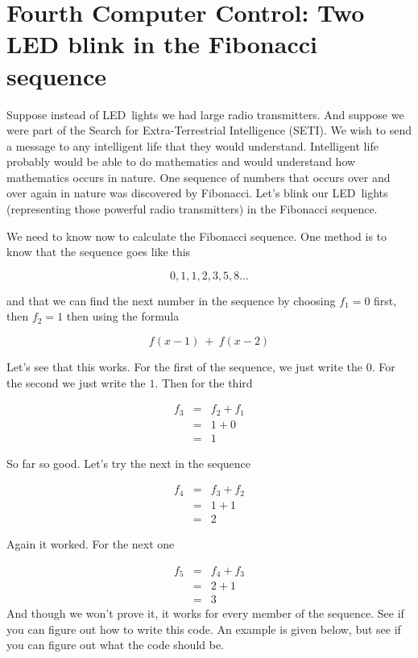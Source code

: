 \section{Fourth Computer Control: Two LED blink in the Fibonacci sequence}

Suppose instead of LED\ lights we had large radio transmitters. And suppose
we were part of the Search for Extra-Terrestrial Intelligence (SETI). We
wish to send a message to any intelligent life that they would understand.
Intelligent life probably would be able to do mathematics and would
understand how mathematics occurs in nature. One sequence of numbers that
occurs over and over again in nature was discovered by Fibonacci. Let's
blink our LED\ lights (representing those powerful radio transmitters) in
the Fibonacci sequence.

We need to know now to calculate the Fibonacci sequence. One method is to
know that the sequence goes like this

\begin{equation*}
	0,1,1,2,3,5,8\ldots
\end{equation*}

and that we can find the next number in the sequence by choosing $f_{1}=0$
first, then $f_{2}=1$ then using the formula 

\begin{equation*}
	f(x-1)\ +\ f(x-2)
\end{equation*}

Let's see that this works. For the first of the sequence, we just write the $
0.$ For the second we just write the $1.$ Then for the third 

\begin{eqnarray*}
	f_{3} &=&f_{2}+f_{1} \\
	&=&1+0 \\
	&=&1
\end{eqnarray*}

So far so good. Let's try the next in the sequence

\begin{eqnarray*}
	f_{4} &=&f_{3}+f_{2} \\
	&=&1+1 \\
	&=&2
\end{eqnarray*}

Again it worked. For the next one

\begin{eqnarray*}
	f_{5} &=&f_{4}+f_{3} \\
	&=&2+1 \\
	&=&3
\end{eqnarray*}
And though we won't prove it, it works for every member of the sequence. See
if you can figure out how to write this code. An example is given below, but
see if you can figure out what the code should be.

